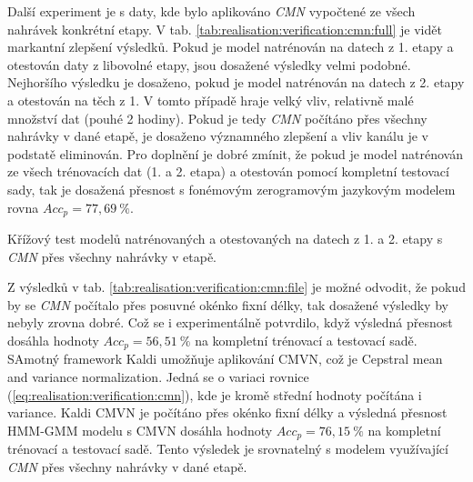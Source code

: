 Další experiment je s daty, kde bylo aplikováno \textit{CMN} vypočtené ze všech nahrávek konkrétní etapy. V tab. \ref{tab:realisation:verification:cmn:full} je vidět markantní zlepšení výsledků. Pokud je model natrénován na datech z 1. etapy a otestován daty z libovolné etapy, jsou dosažené výsledky velmi podobné. Nejhoršího výsledku je dosaženo, pokud je model natrénován na datech z 2. etapy a otestován na těch z 1. V tomto případě hraje velký vliv, relativně malé množství dat (pouhé 2 hodiny). Pokud je tedy \textit{CMN} počítáno přes všechny nahrávky v dané etapě, je dosaženo významného zlepšení a vliv kanálu je v podstatě eliminován. Pro doplnění je dobré zmínit, že pokud je model natrénován ze všech trénovacích dat (1. a 2. etapa) a otestován pomocí kompletní testovací sady, tak je dosažená přesnost s fonémovým zerogramovým jazykovým modelem rovna $Acc_{p} = 77,69\ \%$.


\begin{table}[htpb]
  \centering
  \def\arraystretch{1.5}
  \caption{Křížový test modelů natrénovaných a otestovaných na datech z 1. a 2. etapy s \textit{CMN}  přes všechny nahrávky v etapě.}
  \label{tab:realisation:verification:cmn:full}
\end{table}

Z výsledků v tab. \ref{tab:realisation:verification:cmn:file} je možné odvodit, že pokud by se \textit{CMN} počítalo přes posuvné okénko fixní délky, tak dosažené výsledky by nebyly zrovna dobré. Což se i experimentálně potvrdilo, když výsledná přesnost dosáhla hodnoty $Acc_{p} = 56,51\ \%$ na kompletní trénovací a testovací sadě. SAmotný framework Kaldi umožňuje aplikování CMVN, což je Cepstral mean and variance normalization. Jedná se o variaci rovnice (\ref{eq:realisation:verification:cmn}), kde je kromě střední hodnoty počítána i variance. Kaldi CMVN je počítáno přes okénko fixní délky a výsledná přesnost HMM-GMM modelu s CMVN dosáhla hodnoty $Acc_{p} = 76,15\ \%$ na kompletní trénovací a testovací sadě. Tento výsledek je srovnatelný s modelem využívající \textit{CMN} přes všechny nahrávky v dané etapě.


